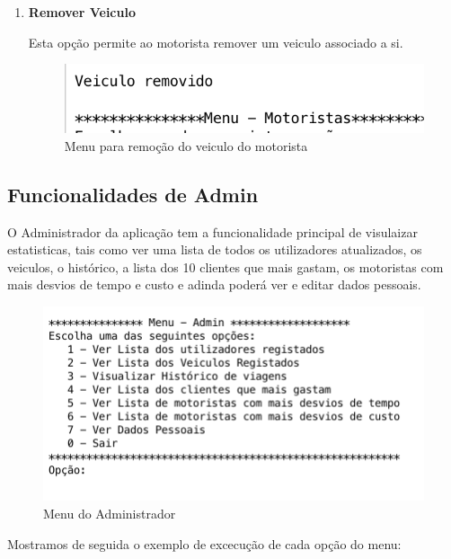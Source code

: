 \begin{enumerate}
\item \textbf{Remover Veiculo}

Esta opção permite ao motorista remover um veiculo associado a si. 
\begin{figure}[htpb]
	\centering
	\includegraphics[scale=0.6]{imagem/veiculoRemovido}
	\caption{Menu para remoção do veiculo do motorista}
	\label{p3:fig:p3_veiculoRemovido}
\end{figure}

\end{enumerate}
\subsection{Funcionalidades de Admin}
O Administrador da aplicação tem a funcionalidade principal de visulaizar estatisticas, tais como ver uma lista de todos os utilizadores atualizados, os veiculos, o histórico, a lista dos 10 clientes que mais gastam, os motoristas com mais desvios de tempo e custo e adinda poderá ver e editar dados pessoais. 

\begin{figure}[htpb]
	\centering
	\includegraphics[scale=0.6]{imagem/menuAdmin}
	\caption{Menu do Administrador }
	\label{p3:fig:p3_menuAdmin}
\end{figure}

\newpage
Mostramos de seguida o exemplo de excecução de cada opção do menu: 

